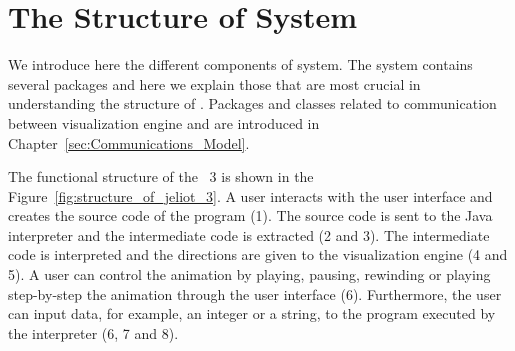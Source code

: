 \section{The Structure of \jel{} System}
\label{sec:The_Components_of_the_Jeliot_3_System}

We introduce here the different components of \jel{} system. The system contains several packages and here we explain those that are most crucial in understanding the structure of \jel{}. Packages and classes related to communication between visualization engine and \djava{} are introduced in Chapter~\ref{sec:Communications_Model}.

The functional structure of the \jel{}~3 is shown in the Figure~\ref{fig:structure_of_jeliot_3}. A user interacts with the user interface and creates the source code of the program (1). The source code is sent to the Java interpreter and the intermediate code is extracted (2 and 3). The intermediate code is interpreted and the directions are given to the visualization engine (4 and 5). A user can control the animation by playing, pausing, rewinding or playing step-by-step the animation through the user interface (6). Furthermore, the user can input data, for example, an integer or a string, to the program executed by the interpreter (6, 7 and 8).

